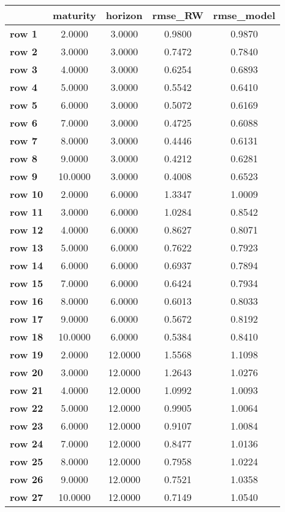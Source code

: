 \begin{tiny}\begin{tabular}{|l|c|c|c|c|}
\hline
&\textbf{maturity}&\textbf{horizon}&\textbf{rmse_RW}&\textbf{rmse_model}\\\hline
\textbf{row 1}&2.0000&3.0000&0.9800&0.9870\\\hline
\textbf{row 2}&3.0000&3.0000&0.7472&0.7840\\\hline
\textbf{row 3}&4.0000&3.0000&0.6254&0.6893\\\hline
\textbf{row 4}&5.0000&3.0000&0.5542&0.6410\\\hline
\textbf{row 5}&6.0000&3.0000&0.5072&0.6169\\\hline
\textbf{row 6}&7.0000&3.0000&0.4725&0.6088\\\hline
\textbf{row 7}&8.0000&3.0000&0.4446&0.6131\\\hline
\textbf{row 8}&9.0000&3.0000&0.4212&0.6281\\\hline
\textbf{row 9}&10.0000&3.0000&0.4008&0.6523\\\hline
\textbf{row 10}&2.0000&6.0000&1.3347&1.0009\\\hline
\textbf{row 11}&3.0000&6.0000&1.0284&0.8542\\\hline
\textbf{row 12}&4.0000&6.0000&0.8627&0.8071\\\hline
\textbf{row 13}&5.0000&6.0000&0.7622&0.7923\\\hline
\textbf{row 14}&6.0000&6.0000&0.6937&0.7894\\\hline
\textbf{row 15}&7.0000&6.0000&0.6424&0.7934\\\hline
\textbf{row 16}&8.0000&6.0000&0.6013&0.8033\\\hline
\textbf{row 17}&9.0000&6.0000&0.5672&0.8192\\\hline
\textbf{row 18}&10.0000&6.0000&0.5384&0.8410\\\hline
\textbf{row 19}&2.0000&12.0000&1.5568&1.1098\\\hline
\textbf{row 20}&3.0000&12.0000&1.2643&1.0276\\\hline
\textbf{row 21}&4.0000&12.0000&1.0992&1.0093\\\hline
\textbf{row 22}&5.0000&12.0000&0.9905&1.0064\\\hline
\textbf{row 23}&6.0000&12.0000&0.9107&1.0084\\\hline
\textbf{row 24}&7.0000&12.0000&0.8477&1.0136\\\hline
\textbf{row 25}&8.0000&12.0000&0.7958&1.0224\\\hline
\textbf{row 26}&9.0000&12.0000&0.7521&1.0358\\\hline
\textbf{row 27}&10.0000&12.0000&0.7149&1.0540\\\hline
\end{tabular}
\end{tiny}
